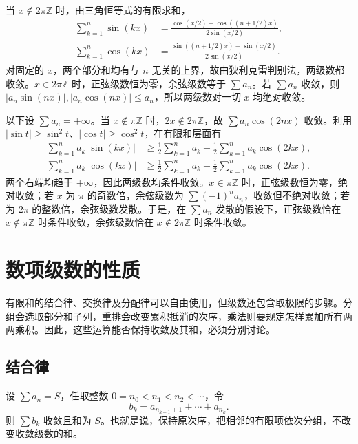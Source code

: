 \documentclass[UTF8,12pt,a4paper,fontset=fandol]{ctexbook}
\begin{document}
\begin{solve}
当 $x\notin2\pi\mathbb Z$ 时，由三角恒等式的有限求和，
\begin{align*}
    \sum_{k=1}^n\sin(kx)
       &=\frac{\cos(x/2)-\cos((n+1/2)x)}{2\sin(x/2)},\\
    \sum_{k=1}^n\cos(kx)
       &=\frac{\sin((n+1/2)x)-\sin(x/2)}{2\sin(x/2)}.
\end{align*}
对固定的 $x$，两个部分和均有与 $n$ 无关的上界，故由狄利克雷判别法，两级数都收敛。$x\in2\pi\mathbb Z$ 时，正弦级数恒为零，余弦级数等于 $\sum a_n$。若 $\sum a_n$ 收敛，则 $|a_n\sin(nx)|,|a_n\cos(nx)|\leq a_n$，所以两级数对一切 $x$ 均绝对收敛。

以下设 $\sum a_n=+\infty$。当 $x\notin\pi\mathbb Z$ 时，$2x\notin2\pi\mathbb Z$，故 $\sum a_n\cos(2nx)$ 收敛。利用 $|\sin t|\geq\sin^2t$、$|\cos t|\geq\cos^2t$，在有限和层面有
\begin{align*}
    \sum_{k=1}^n a_k|\sin(kx)|
       &\geq\frac12\sum_{k=1}^n a_k
             -\frac12\sum_{k=1}^n a_k\cos(2kx),\\
    \sum_{k=1}^n a_k|\cos(kx)|
       &\geq\frac12\sum_{k=1}^n a_k
             +\frac12\sum_{k=1}^n a_k\cos(2kx).
\end{align*}
两个右端均趋于 $+\infty$，因此两级数均条件收敛。$x\in\pi\mathbb Z$ 时，正弦级数恒为零，绝对收敛；若 $x$ 为 $\pi$ 的奇数倍，余弦级数为 $\sum(-1)^na_n$，收敛但不绝对收敛；若为 $2\pi$ 的整数倍，余弦级数发散。于是，在 $\sum a_n$ 发散的假设下，正弦级数恰在 $x\notin\pi\mathbb Z$ 时条件收敛，余弦级数恰在 $x\notin2\pi\mathbb Z$ 时条件收敛。
\end{solve}

\section{数项级数的性质}
\label{sec:properties-of-numerical-series}

有限和的结合律、交换律及分配律可以自由使用，但级数还包含取极限的步骤。分组会选取部分和子列，重排会改变累积抵消的次序，乘法则要规定怎样累加所有两两乘积。因此，这些运算能否保持收敛及其和，必须分别讨论。

\subsection{结合律}
\label{subsec:associativity-of-series}

\begin{theorem}[收敛级数的分组]
\label{thm:grouping-convergent-series}
设 $\sum a_n=S$，任取整数 $0=n_0<n_1<n_2<\cdots$，令
\[
    b_k=a_{n_{k-1}+1}+\cdots+a_{n_k}.
\]
则 $\sum b_k$ 收敛且和为 $S$。也就是说，保持原次序，把相邻的有限项依次分组，不改变收敛级数的和。
\end{theorem}
\end{document}
